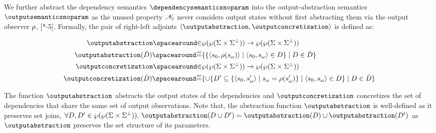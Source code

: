 We further abstract the dependency semantics $\dependencysemanticsnoparam$ into the output-abstraction semantics $\outputsemanticsnoparam$ as the unused property $\unused$ never considers output states without first abstracting them via the output observer $\rho$, [*-5].
Formally, the pair of right-left adjoints $\tuple{\outputabstraction}{\outputconcretization}$ is defined as:
%
\begin{definition}
\begin{align*}
  \outputabstraction \IN& \dependencytype \to \outputtype \\
  \outputabstraction(\defsetofsetofdependencies) \DefeQ& \setdef{
    \setdef{
      \tuple{\retrieveinput{\defstate}}{\outputobs(\retrieveoutput{\defstate})}
    }{
      \inputoutputtuple{\defstate}\in\defsetofdependencies
    }
  }{
    \defsetofdependencies \in \defsetofsetofdependencies
  }\\
  \outputconcretization \IN& \outputtype \to \dependencytype \\
  \outputconcretization(\defsetofsetofdependencies) \DefeQ& \setdef{
    \setjoin \setdef{
      \defsetofdependencies' \subseteq
      \setdef{
        \tuple{\retrieveinput\defstate}{\retrieveoutput\defstate'}
      }{
        \retrieveoutput{\defstate} = \outputobs(\retrieveoutput{\defstate'})
      }
    }{
      \inputoutputtuple{\defstate} \in \defsetofdependencies
    }
  }{
    \defsetofdependencies\in\defsetofsetofdependencies
  }
\end{align*}
\end{definition}
The function $\outputabstraction$ abstracts the output states of the dependencies and $\outputconcretization$ concretizes the set of dependencies that share the same set of output observations.
Note that, the abstraction function $\outputabstraction$ is well-defined as it preserves set joins, \ie{} $\forall \defsetofdependencies, \defsetofdependencies' \in\outputtype.\spacer \outputabstraction(\defsetofdependencies \setjoin \defsetofdependencies') = \outputabstraction(\defsetofdependencies) \setjoin \outputabstraction(\defsetofdependencies')$ as $\outputabstraction$ preserves the set structure of its parameters.

